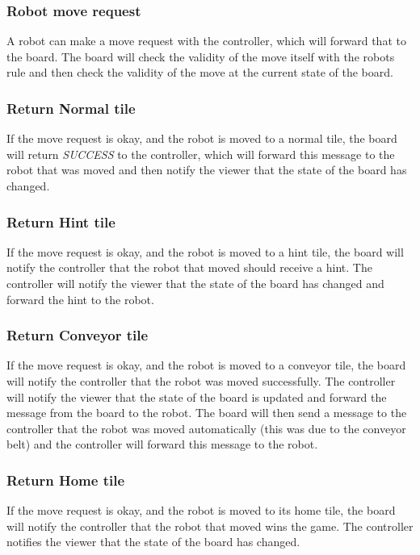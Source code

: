 	\subsubsection{Robot move request}
	A robot can make a move request with the controller, which will forward that to the board. The board will check the validity of the move itself with the robots rule and then check the validity of the move at the current state of the board.

	

	\subsubsection{Return Normal tile}
	If the move request is okay, and the robot is moved to a normal tile, the board will return \emph{SUCCESS} to the controller, which will forward this message to the robot that was moved and then notify the viewer that the state of the board has changed.

	

	\subsubsection{Return Hint tile}
	If the move request is okay, and the robot is moved to a hint tile, the board will notify the controller that the robot that moved should receive a hint. The controller will notify the viewer that the state of the board has changed and forward the hint to the robot.

	

	\subsubsection{Return Conveyor tile}
	If the move request is okay, and the robot is moved to a conveyor tile, the board will notify the controller that the robot was moved successfully. The controller will notify the viewer that the state of the board is updated and forward the message from the board to the robot. The board will then send a message to the controller that the robot was moved automatically (this was due to the conveyor belt) and the controller will forward this message to the robot.

	

	\subsubsection{Return Home tile}
	If the move request is okay, and the robot is moved to its home tile, the board will notify the controller that the robot that moved wins the game. The controller notifies the viewer that the state of the board has changed.


